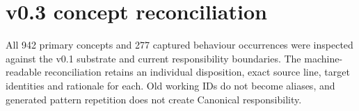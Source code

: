 \chapter{v0.3 concept reconciliation}\label{model:reconciliation}
All 942 primary concepts and 277 captured behaviour occurrences were inspected against the v0.1 substrate and current responsibility boundaries. The machine-readable reconciliation retains an individual disposition, exact source line, target identities and rationale for each. Old working IDs do not become aliases, and generated pattern repetition does not create Canonical responsibility.

\begingroup\small\setlength{\TableWidth}{\dimexpr\linewidth-4\tabcolsep-3\arrayrulewidth\relax}
